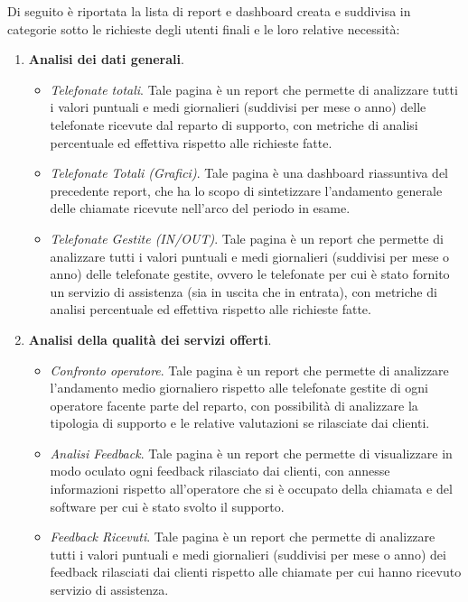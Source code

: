 Di seguito è riportata la lista di report e dashboard creata e suddivisa in categorie sotto le richieste degli utenti finali e le loro relative necessità:

\begin{enumerate}
    \item \textbf{Analisi dei dati generali}.   
        \begin{itemize}
            \item \textit{Telefonate totali}. Tale pagina è un report che permette di analizzare tutti i valori puntuali e medi giornalieri (suddivisi per mese o anno) delle telefonate ricevute dal reparto di supporto, con metriche di analisi percentuale ed effettiva rispetto alle richieste fatte.
            \item \textit{Telefonate Totali (Grafici)}. Tale pagina è una dashboard riassuntiva del precedente report, che ha lo scopo di sintetizzare l'andamento generale delle chiamate ricevute nell'arco del periodo in esame.
            \item \textit{Telefonate Gestite (IN/OUT)}. Tale pagina è un report che permette di analizzare tutti i valori puntuali e medi giornalieri (suddivisi per mese o anno) delle telefonate gestite, ovvero le telefonate per cui è stato fornito un servizio di assistenza (sia in uscita che in entrata), con metriche di analisi percentuale ed effettiva rispetto alle richieste fatte.  
        \end{itemize}
    \item \textbf{Analisi della qualità dei servizi offerti}.
        \begin{itemize}
            \item \textit{Confronto operatore}. Tale pagina è un report che permette di analizzare l'andamento medio giornaliero rispetto alle telefonate gestite di ogni operatore facente parte del reparto, con possibilità di analizzare la tipologia di supporto e le relative valutazioni se rilasciate dai clienti.
            \item \textit{Analisi Feedback}. Tale pagina è un report che permette di visualizzare in modo oculato ogni feedback rilasciato dai clienti, con annesse informazioni rispetto all'operatore che si è occupato della chiamata e del software per cui è stato svolto il supporto.
            \item \textit{Feedback Ricevuti}. Tale pagina è un report che permette di analizzare tutti i valori puntuali e medi giornalieri (suddivisi per mese o anno) dei feedback rilasciati dai clienti rispetto alle chiamate per cui hanno ricevuto servizio di assistenza.

\end{itemize}
\end{enumerate}
